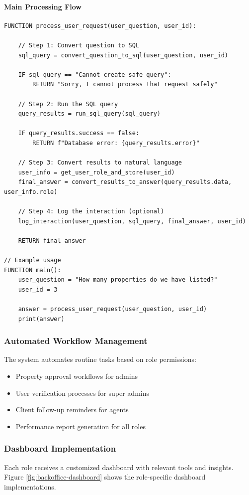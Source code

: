 \paragraph{Main Processing Flow}
\begin{verbatim}
FUNCTION process_user_request(user_question, user_id):
    
    // Step 1: Convert question to SQL
    sql_query = convert_question_to_sql(user_question, user_id)
    
    IF sql_query == "Cannot create safe query":
        RETURN "Sorry, I cannot process that request safely"
    
    // Step 2: Run the SQL query
    query_results = run_sql_query(sql_query)
    
    IF query_results.success == false:
        RETURN f"Database error: {query_results.error}"
    
    // Step 3: Convert results to natural language
    user_info = get_user_role_and_store(user_id)
    final_answer = convert_results_to_answer(query_results.data, user_info.role)
    
    // Step 4: Log the interaction (optional)
    log_interaction(user_question, sql_query, final_answer, user_id)
    
    RETURN final_answer

// Example usage
FUNCTION main():
    user_question = "How many properties do we have listed?"
    user_id = 3
    
    answer = process_user_request(user_question, user_id)
    print(answer)
\end{verbatim}

\subsubsection{Automated Workflow Management}
The system automates routine tasks based on role permissions:
\begin{itemize}
    \item Property approval workflows for admins
    \item User verification processes for super admins
    \item Client follow-up reminders for agents
    \item Performance report generation for all roles
\end{itemize}

\subsubsection{Dashboard Implementation}
Each role receives a customized dashboard with relevant tools and insights. Figure \ref{fig:backoffice-dashboard} shows the role-specific dashboard implementations.

